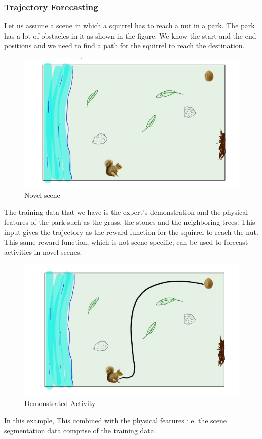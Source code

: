 \documentclass[11pt]{article}
\begin{document}
\subsubsection{Trajectory Forecasting}
Let us assume a scene in which a squirrel has to reach a nut in a park. The park has a lot of obstacles in it as shown in the figure. We know the start and the end positions and we need to find a path for the squirrel to reach the destination. \newline
\begin{figure}[H]
\centering
\includegraphics[width=0.8\linewidth]{figs/IMG_0208.JPG}
\caption{Novel scene}
\label{fig:ns}
\end{figure}

The training data that we have is the expert's demonstration and the physical features of the park such as the grass, the stones and the neighboring trees. This input gives the trajectory as the reward function for the squirrel to reach the nut. This same reward function, which is not scene specific, can be used to forecast activities in novel scenes. \newline 

\begin{figure}[H]
\centering
\includegraphics[width=0.8\linewidth]{figs/IMG_0209.JPG}
\caption{Demonstrated Activity}
\label{fig:nsa}
\end{figure}
In this example, This combined with the physical features i.e. the scene segmentation data comprise of the training data.
\end{document}
